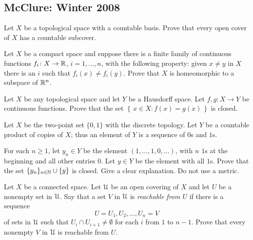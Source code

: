 \subsection{McClure: Winter 2008}
\setcounter{exercise}{0}

\begin{problem}
  Let $X$ be a topological space with a countable basis. Prove that every
  open cover of $X$ has a countable subcover.
\end{problem}
\begin{solution}
\end{solution}

\begin{problem}
  Let $X$ be a compact space and suppose there is a finite family of
  continuous functions $f_i\colon X\to\mathbb{R}$, $i=1,\ldots,n$, with the
  following property: given $x\neq y$ in $X$ there is an $i$ such that
  $f_i(x)\neq f_i(y)$. Prove that $X$ is homeomorphic to a subspace of
  $\mathbb{R}^n$.
\end{problem}
\begin{solution}
\end{solution}

\begin{problem}
  Let $X$ be any topological space and let $Y$ be a Hausdorff space. Let
  $f,g\colon X\to Y$ be continuous functions. Prove that the set
  $\left\{\,x\in X:f(x)=g(x)\,\right\}$ is closed.
\end{problem}
\begin{solution}
\end{solution}

\begin{problem}
  Let $X$ be the two-point set $\{0,1\}$ with the discrete topology. Let
  $Y$ be a countable product of copies of $X$; thus an element of $Y$ is a
  sequence of $0$s and $1$s.

  For each $n\geq 1$, let $y_n\in Y$ be the element
  $(1,\ldots,1,0,\ldots)$, with $n$ $1$s at the beginning and all other
  entries $0$. Let $y\in Y$ be the element with all $1$s. Prove that the
  set $\{y_n\}_{n\in\mathbb{N}}\cup\{y\}$ is closed. Give a clear explanation. Do
  not use a metric.
\end{problem}
\begin{solution}
\end{solution}

\begin{problem}
  Let $X$ be a connected space. Let $\mathcal{U}$ be an open covering of $X$ and
  let $U$ be a nonempty set in $\mathcal{U}$. Say that a set $V$ in $\mathcal{U}$ is
  \emph{reachable from $U$} if there is a sequence
  \[
    U=U_1,U_2,\ldots,U_n=V
  \]
  of sets in $\mathcal{U}$ such that $U_i\cap U_{i+1}\neq\emptyset$ for each $i$
  from $1$ to $n-1$. Prove that every nonempty $V$ in $\mathcal{U}$ is reachable
  from $U$.
\end{problem}
\begin{solution}
\end{solution}

